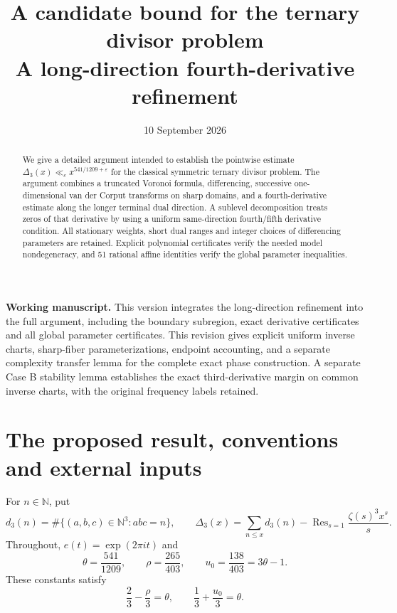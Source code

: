 \documentclass[11pt,a4paper]{article}
\title{A candidate bound for the ternary divisor problem\\
\large A long-direction fourth-derivative refinement}
\author{}
\date{10 September 2026}
\numberwithin{equation}{section}
\theoremstyle{remark}
\newcommand{\N}{\mathbb N}
\newcommand{\eps}{\varepsilon}
\DeclareMathOperator*{\Res}{Res}
\begin{document}
\maketitle
\begin{abstract}
We give a detailed argument intended to establish the pointwise estimate
$\Delta_3(x)\ll_\eps x^{541/1209+\eps}$ for the classical symmetric ternary
divisor problem. The argument combines a truncated Voronoi formula,
differencing, successive one-dimensional van der Corput transforms on sharp
domains, and a fourth-derivative estimate along the longer terminal dual
direction. A sublevel decomposition treats zeros of that derivative by
using a uniform same-direction fourth/fifth derivative condition.
All stationary weights,
short dual ranges and integer choices of differencing parameters are retained.
Explicit polynomial certificates verify the needed model nondegeneracy, and
51 rational affine identities verify the global parameter inequalities.
\end{abstract}

\noindent\textbf{Working manuscript.}
This version integrates the long-direction refinement into the full argument,
including the boundary subregion, exact derivative certificates and all global
parameter certificates. This revision gives explicit uniform inverse charts,
sharp-fiber parameterizations, endpoint accounting, and a separate complexity
transfer lemma for the complete exact phase construction.
A separate Case B stability lemma establishes the exact third-derivative
margin on common inverse charts, with the original frequency labels retained.

\tableofcontents

\section{The proposed result, conventions and external inputs}
\label{sec:inputs}
For $n\in\N$, put
\[
 d_3(n)=\#\{(a,b,c)\in\N^3:abc=n\},\qquad
 \Delta_3(x)=\sum_{n\le x}d_3(n)
   -\Res_{s=1}\frac{\zeta(s)^3x^s}{s}.
\]
Throughout, $e(t)=\exp(2\pi i t)$ and
\begin{equation}\label{eq:parameters}
 \theta=\frac{541}{1209},\qquad
 \rho=\frac{265}{403},\qquad
 u_0=\frac{138}{403}=3\theta-1.
\end{equation}
These constants satisfy
\begin{equation}\label{eq:endpoint-identities}
 \frac23-\frac\rho3=\theta,
 \qquad \frac13+\frac{u_0}{3}=\theta.
\end{equation}
\end{document}
